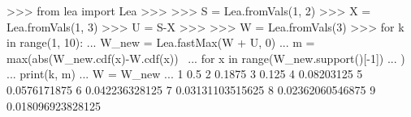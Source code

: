 
>>> from lea import Lea
>>> 
>>> S = Lea.fromVals(1,  2)
>>> X = Lea.fromVals(1,  3)
>>> U = S-X
>>> 
>>> W = Lea.fromVals(3)
>>> for k in range(1, 10):
...     W_new = Lea.fastMax(W + U, 0)
...     m = max(abs(W_new.cdf(x)-W.cdf(x)) \
...             for x in range(W_new.support()[-1])
...             )
...     print(k, m) 
...     W = W_new
... 
1 0.5
2 0.1875
3 0.125
4 0.08203125
5 0.0576171875
6 0.042236328125
7 0.03131103515625
8 0.02362060546875
9 0.018096923828125
